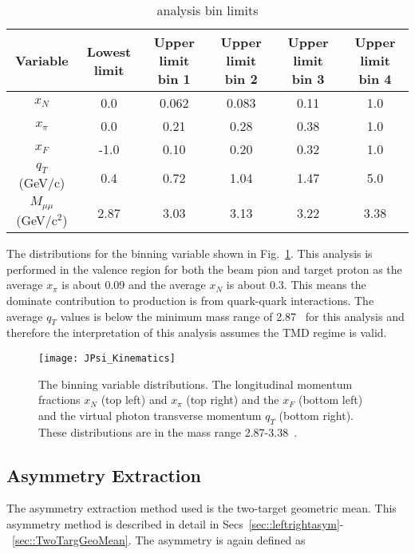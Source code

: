 \begin{table}[h!t]
  \begin{adjustwidth}{-1.4cm}{}
  \centering
  \begin{tabular}{ |c|c|c|c|c|c| }
    \hline \textbf{Variable}& \textbf{Lowest limit}& \textbf{Upper limit bin
      1}& \textbf{Upper limit bin 2}& \textbf{Upper limit bin 3}&
    \textbf{Upper limit bin 4}\\ \hline
    
    $x_N$& 0.0& 0.062& 0.083& 0.11& 1.0\\ \hline
    
    $x_{\pi}$& 0.0& 0.21& 0.28& 0.38& 1.0\\ \hline
    
    $x_F$& -1.0& 0.10& 0.20& 0.32& 1.0\\ \hline
    
    $q_T$ (GeV/c)& 0.4& 0.72& 1.04& 1.47& 5.0\\ \hline
    
    $M_{\mu\mu}$ (GeV/c$^2$)& 2.87& 3.03& 3.13& 3.22& 3.38 \\ \hline
    
  \end{tabular}
  \caption{{\jp} analysis bin limits}
  \label{tab::JPsi_binning}
  \end{adjustwidth}
\end{table}

The distributions for the binning variable shown in
Fig.~\ref{fig::JPsi_Kinematics}.  This analysis is performed in the valence
region for both the beam pion and target proton as the average $x_\pi$ is about
0.09 and the average $x_N$ is about 0.3.  This means the dominate contribution
to {\jp} production is from quark-quark interactions.  The average $q_T$ values
is below the minimum mass range of 2.87~{\gvcw} for this analysis and therefore
the interpretation of this analysis assumes the TMD regime is valid.

\begin{figure}[h!t]
  \centering \texttt{[image: JPsi\_Kinematics]}
  \caption{The binning variable distributions. The longitudinal momentum
    fractions $x_N$ (top left) and $x_\pi$ (top right) and the $x_F$ (bottom
    left) and the virtual photon transverse momentum $q_T$ (bottom right).
    These distributions are in the mass range 2.87-3.38~{\gvcw}.}
  \label{fig::JPsi_Kinematics}
\end{figure}


\subsection{Asymmetry Extraction}
The asymmetry extraction method used is the two-target geometric mean.  This
asymmetry method is described in detail in
Secs~\ref{sec::leftrightasym}-~\ref{sec::TwoTargGeoMean}.  The asymmetry is
again defined as

